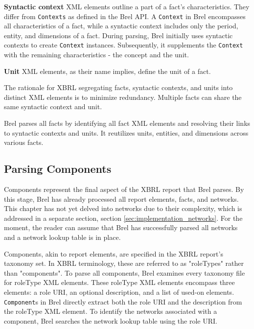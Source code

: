 \textbf{Syntactic context} XML elements outline a part of a fact's characteristics.
They differ from \texttt{Contexts} as defined in the Brel API.
A \texttt{Context} in Brel encompasses all characteristics of a fact, while a syntactic context includes only the period, entity, and dimensions of a fact.
During parsing, Brel initially uses syntactic contexts to create \texttt{Context} instances.
Subsequently, it supplements the \texttt{Context} with the remaining characteristics - the concept and the unit.

\textbf{Unit} XML elements, as their name implies, define the unit of a fact.

The rationale for XBRL segregating facts, syntactic contexts, and units into distinct XML elements is to minimize redundancy.
Multiple facts can share the same syntactic context and unit.

Brel parses all facts by identifying all fact XML elements and resolving their links to syntactic contexts and units.
It reutilizes units, entities, and dimensions across various facts.

\subsection{Parsing Components}
\label{sec:implementation_components}

Components represent the final aspect of the XBRL report that Brel parses.
By this stage, Brel has already processed all report elements, facts, and networks.
This chapter has not yet delved into networks due to their complexity, which is addressed in a separate section, section \ref{sec:implementation_networks}.
For the moment, the reader can assume that Brel has successfully parsed all networks and a network lookup table is in place.

Components, akin to report elements, are specified in the XBRL report's taxonomy set.
In XBRL terminology, these are referred to as "roleTypes" rather than "components".
To parse all components, Brel examines every taxonomy file for roleType XML elements.
These roleType XML elements encompass three elements: a role URI, an optional description, and a list of used-on elements.
\texttt{Component}s in Brel directly extract both the role URI and the description from the roleType XML element.
To identify the networks associated with a component, Brel searches the network lookup table using the role URI.

